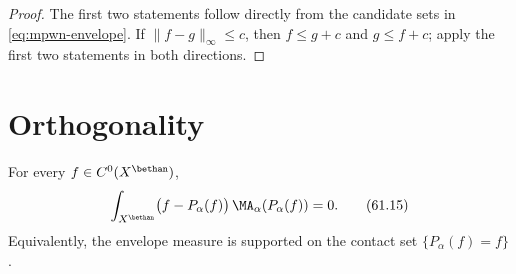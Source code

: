 \begin{proof}
The first two statements follow directly from the candidate sets in
\eqref{eq:mpwn-envelope}.  If $\|f-g\|_\infty\leq c$, then
$f\leq g+c$ and $g\leq f+c$; apply the first two statements in both
directions.
\end{proof}

\section{Orthogonality}
\label{sec:mpwn-orthogonality}

\noindent\begin{minipage}{\linewidth}
\begin{theorem}\label{thm:mpwn-orthogonality}
For every $f\in C^0(X^{\bethan})$,
\[
 \int_{X^{\bethan}}
        \bigl(f-P_\alpha(f)\bigr)\,
        \MA_\alpha(P_\alpha(f))=0.
\tag{61.15}\label{eq:mpwn-orthogonality}
\]
Equivalently, the envelope measure is supported on the contact set
$\{P_\alpha(f)=f\}$.
\end{theorem}
\end{minipage}\par

